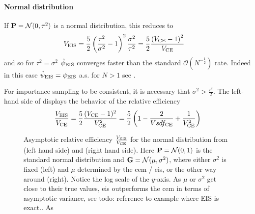 \begin{example}
    \paragraph{Normal distribution}
    If $\P = \mathcal N(0, \tau^{2})$ is a normal distribution, this reduces to
    \begin{align*}
        V_{\eis} &= \frac{5}{2} \left( \frac{\tau^{2}}{\sigma^{2}} - 1 \right)^{2} \frac{\sigma^{2}}{\tau^{2}} = \frac{5}{2} \frac{\left( V_{\ce} - 1\right)^{2}}{V_{\ce}}
    \end{align*}
    and so for $\tau^{2} = \sigma^{2}$ $\hpeis$ converges faster than the standard $\mathcal O( N^{-\frac{1}{2}})$ rate. Indeed in this case $\hpeis = \peis$ a.s. for $N > 1$ see . 

    For importance sampling to be consistent, it is necessary that $\sigma^{2} > \frac{\tau^{2}}{2}$. The left-hand side of  displays the behavior of the relative efficiency
    $$
    \frac{V_{\eis}}{V_{\ce}} = \frac{5}{2} \frac{(V_{\ce} - 1)^{2}}{V_{\ce}^{2}} = \frac{5}{2} \left( 1 - \frac{2}{Vsdf_{\ce}} + \frac{1}{V_{\ce}^2} \right)
    $$

    \begin{figure}
        \centering

        \begin{subfigure}{.49\textwidth}
            \resizebox{\textwidth}{!}{%
            }
        \end{subfigure}
        \begin{subfigure}{.49\textwidth}
            \resizebox{\textwidth}{!}{%
            }
        \end{subfigure}
        \label{fig:normal_are}
        \caption{Asymptotic relative efficiency $\frac{V_{\eis}}{V_{\ce}}$ for the normal distribution from  (left hand side) and  (right hand side). Here $\P = \mathcal N(0, 1)$ is the standard normal distribution and $\G = \mathcal N(\mu, \sigma^{2})$, where either $\sigma^{2}$ is fixed (left) and $\mu$ determined by the \gls{cem} / \gls{eis}, or the other way around (right). Notice the log scale of the $y$-axis. As $\mu$ or $\sigma^{2}$ get close to their true values, \gls{eis} outperforms the \gls{cem} in terms of asymptotic variance, see {\color{red} todo:  reference to example where EIS is exact.}. As}
    \end{figure}
    


\end{example}
